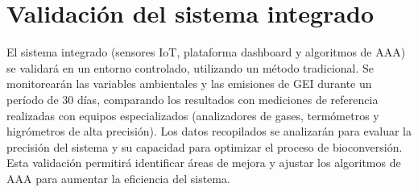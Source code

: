 \section{Validación del sistema integrado}

El sistema integrado (sensores IoT, plataforma dashboard y algoritmos de AAA) se validará en un entorno controlado, utilizando un método tradicional. Se monitorearán las variables ambientales y las emisiones de GEI durante un período de 30 días, comparando los resultados con mediciones de referencia realizadas con equipos especializados (analizadores de gases, termómetros y higrómetros de alta precisión). Los datos recopilados se analizarán para evaluar la precisión del sistema y su capacidad para optimizar el proceso de bioconversión. Esta validación permitirá identificar áreas de mejora y ajustar los algoritmos de AAA para aumentar la eficiencia del sistema.